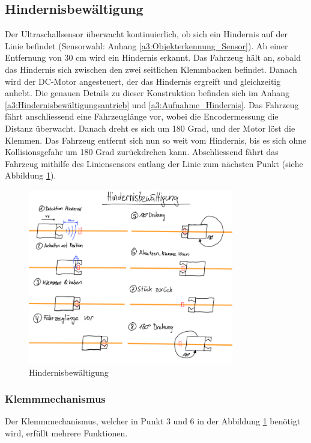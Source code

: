 \documentclass[../main.tex]{subfiles}
\begin{document}
\subsection{Hindernisbewältigung}
Der Ultraschallsensor überwacht kontinuierlich, ob sich ein Hindernis auf der Linie befindet (Sensorwahl: Anhang \ref{a3:Objekterkennung_Sensor}). Ab einer Entfernung von 30 cm wird ein Hindernis erkannt. Das Fahrzeug hält an, sobald das Hindernis sich zwischen den zwei seitlichen Klemmbacken befindet. Danach wird der DC-Motor angesteuert, der das Hindernis ergreift und gleichzeitig anhebt. Die genauen Details zu dieser Konstruktion befinden sich im Anhang \ref{a3:Hindernisbewältigungsantrieb} und \ref{a3:Aufnahme_Hindernis}.
Das Fahrzeug fährt anschliessend eine Fahrzeuglänge vor, wobei die Encodermessung die Distanz überwacht. Danach dreht es sich um 180 Grad, und der Motor löst die Klemmen. Das Fahrzeug entfernt sich nun so weit vom Hindernis, bis es sich ohne Kollisionsgefahr um 180 Grad zurückdrehen kann. Abschliessend fährt das Fahrzeug mithilfe des Liniensensors entlang der Linie zum nächsten Punkt (siehe Abbildung \ref{img:Skizze_Hindernisbewältigung}).

\begin{figure}[H]
\centering
\includegraphics[width=0.8\textwidth]{img/lösungskonzpet/Skizzen/Skizze_Hindernisbewältigung.png}
\caption{Hindernisbewältigung}
\label{img:Skizze_Hindernisbewältigung}
\end{figure}


\subsubsection{Klemmmechanismus}
Der Klemmmechanismus, welcher in Punkt 3 und 6 in der Abbildung \ref{img:Skizze_Hindernisbewältigung} benötigt wird, erfüllt mehrere Funktionen.
\end{document}
